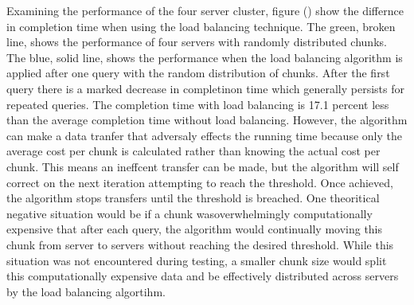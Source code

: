 \documentclass{article}
\begin{document}
\begin{multicols}{2}
\noindent{}

Examining the performance of the four server cluster, figure () show the differnce in completion time when using the load balancing technique.  The green, broken line, shows the performance of four servers with randomly distributed chunks. The blue, solid line, shows the performance when the load balancing algorithm is applied after one query with the random distribution of chunks.  After the first query there is a marked decrease in completinon time which generally persists for repeated queries.  The completion time with load balancing is 17.1 percent less than the average completion time without load balancing.  However, the algorithm can make a data tranfer that adversaly effects the running time because only the average cost per chunk is calculated rather than knowing the actual cost per chunk. This means an ineffcent transfer can be made, but the algorithm will self correct on the next iteration attempting to reach the threshold. Once achieved, the algorithm stops transfers until the threshold is breached. One theoritical negative situation would be if a chunk wasoverwhelmingly computationally expensive that after each query, the algorithm would continually moving this chunk from server to servers without reaching the desired threshold.  While this situation was not encountered during testing, a smaller chunk size would split this computationally expensive data and be effectively distributed across servers by the load balancing algortihm. 


\end{multicols}
\end{document}
